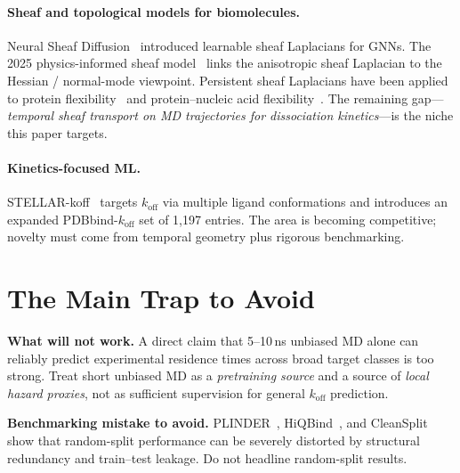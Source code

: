 \documentclass[12pt,a4paper]{article}
\begin{document}
\paragraph{Sheaf and topological models for biomolecules.}
Neural Sheaf Diffusion~\citep{nsd2022} introduced learnable sheaf Laplacians
for GNNs.
The 2025 physics-informed sheaf model~\citep{physicsinformedsheaf2025} links
the anisotropic sheaf Laplacian to the Hessian / normal-mode viewpoint.
Persistent sheaf Laplacians have been applied to protein
flexibility~\citep{pslflex2025} and protein--nucleic acid
flexibility~\citep{pslpna2026}.
The remaining gap---\emph{temporal sheaf transport on MD trajectories for
dissociation kinetics}---is the niche this paper targets.

\paragraph{Kinetics-focused ML.}
STELLAR-koff~\citep{stellarkoff2025} targets $k_{\text{off}}$ via multiple
ligand conformations and introduces an expanded PDBbind-$k_{\text{off}}$ set
of 1{,}197 entries.
The area is becoming competitive; novelty must come from temporal geometry
plus rigorous benchmarking.

\section{The Main Trap to Avoid}
\label{sec:trap}

\begin{warnbox}
\textbf{What will not work.}
A direct claim that 5--10\,ns unbiased MD alone can reliably predict
experimental residence times across broad target classes is too strong.
Treat short unbiased MD as a \emph{pretraining source} and a source of
\emph{local hazard proxies}, not as sufficient supervision for general
$k_{\text{off}}$ prediction.
\end{warnbox}

\begin{warnbox}
\textbf{Benchmarking mistake to avoid.}
PLINDER~\citep{plinder2024}, HiQBind~\citep{hiqbind2025}, and
CleanSplit~\citep{cleansplit2025} show that random-split performance can be
severely distorted by structural redundancy and train--test leakage.
Do not headline random-split results.
\end{warnbox}

\end{document}
